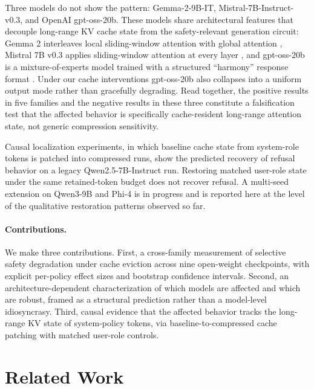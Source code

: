 \documentclass[11pt]{article}
\begin{document}
Three models do not show the pattern: Gemma-2-9B-IT, Mistral-7B-Instruct-v0.3, and OpenAI gpt-oss-20b. These models share architectural features that decouple long-range KV cache state from the safety-relevant generation circuit: Gemma 2 interleaves local sliding-window attention with global attention \citep{team2024gemma}, Mistral 7B v0.3 applies sliding-window attention at every layer \citep{jiang2023mistral}, and gpt-oss-20b is a mixture-of-experts model trained with a structured ``harmony'' response format \citep{openai2025gptoss}. Under our cache interventions gpt-oss-20b also collapses into a uniform output mode rather than gracefully degrading. Read together, the positive results in five families and the negative results in these three constitute a falsification test that the affected behavior is specifically cache-resident long-range attention state, not generic compression sensitivity.

Causal localization experiments, in which baseline cache state from system-role tokens is patched into compressed runs, show the predicted recovery of refusal behavior on a legacy Qwen2.5-7B-Instruct run. Restoring matched user-role state under the same retained-token budget does not recover refusal. A multi-seed extension on Qwen3-9B and Phi-4 is in progress and is reported here at the level of the qualitative restoration patterns observed so far.

\paragraph{Contributions.}
We make three contributions. First, a cross-family measurement of selective safety degradation under cache eviction across nine open-weight checkpoints, with explicit per-policy effect sizes and bootstrap confidence intervals. Second, an architecture-dependent characterization of which models are affected and which are robust, framed as a structural prediction rather than a model-level idiosyncrasy. Third, causal evidence that the affected behavior tracks the long-range KV state of system-policy tokens, via baseline-to-compressed cache patching with matched user-role controls.

\section{Related Work}
\end{document}
